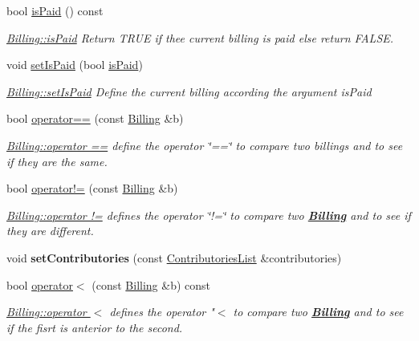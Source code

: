 \begin{DoxyCompactItemize}
bool \hyperlink{classModels_1_1Billing_ab2f9bd62e920be8c68313e35bbcabd46}{is\-Paid} () const 
\begin{DoxyCompactList}\small\item\em \hyperlink{classModels_1_1Billing_ab2f9bd62e920be8c68313e35bbcabd46}{Billing\-::is\-Paid} Return T\-R\-U\-E if thee current billing is paid else return F\-A\-L\-S\-E. \end{DoxyCompactList}\item 
void \hyperlink{classModels_1_1Billing_a99cf8c1b7435fe268b8fa9257cad6c56}{set\-Is\-Paid} (bool \hyperlink{classModels_1_1Billing_ab2f9bd62e920be8c68313e35bbcabd46}{is\-Paid})
\begin{DoxyCompactList}\small\item\em \hyperlink{classModels_1_1Billing_a99cf8c1b7435fe268b8fa9257cad6c56}{Billing\-::set\-Is\-Paid} Define the current billing according the argument {\itshape is\-Paid} \end{DoxyCompactList}\item 
bool \hyperlink{classModels_1_1Billing_af3d8818a1e00eaa707058567fccf045b}{operator==} (const \hyperlink{classModels_1_1Billing}{Billing} \&b)
\begin{DoxyCompactList}\small\item\em \hyperlink{classModels_1_1Billing_af3d8818a1e00eaa707058567fccf045b}{Billing\-::operator ==} define the operator \char`\"{}==\char`\"{} to compare two billings and to see if they are the same. \end{DoxyCompactList}\item 
bool \hyperlink{classModels_1_1Billing_ae6ff88e05384718d57be1be38f250a52}{operator!=} (const \hyperlink{classModels_1_1Billing}{Billing} \&b)
\begin{DoxyCompactList}\small\item\em \hyperlink{classModels_1_1Billing_ae6ff88e05384718d57be1be38f250a52}{Billing\-::operator !=} defines the operator \char`\"{}!=\char`\"{} to compare two {\bfseries \hyperlink{classModels_1_1Billing}{Billing}} and to see if they are different. \end{DoxyCompactList}\item 
\hypertarget{classModels_1_1Billing_acb836caf7aef8e953c432661cb8aa55f}{void {\bfseries set\-Contributories} (const \hyperlink{classModels_1_1ContributoriesList}{Contributories\-List} \&contributories)}\label{classModels_1_1Billing_acb836caf7aef8e953c432661cb8aa55f}

\item 
bool \hyperlink{classModels_1_1Billing_a6d3f5da2e9a0b7de217dc51220c4c7b7}{operator$<$} (const \hyperlink{classModels_1_1Billing}{Billing} \&b) const 
\begin{DoxyCompactList}\small\item\em \hyperlink{classModels_1_1Billing_a6d3f5da2e9a0b7de217dc51220c4c7b7}{Billing\-::operator $<$} defines the operator "$<$ to compare two {\bfseries \hyperlink{classModels_1_1Billing}{Billing}} and to see if the fisrt is anterior to the second. \end{DoxyCompactList}\end{DoxyCompactItemize}
